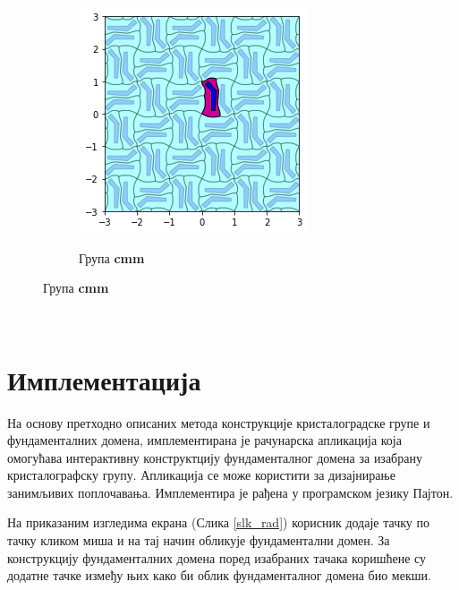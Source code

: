 \documentclass[12pt]{article}
\begin{document}
\begin{samepage}
\begin{figure}[H]
\begin{subfigure}[b]{0.3\textwidth}
  \end{subfigure}
  \begin{subfigure}[b]{0.3\textwidth}
    \includegraphics[width=\textwidth]{output_21_7.png}
    \label{fig:f25}
    \caption{Група \textbf{cmm}}
  \end{subfigure}
\end{figure}
\end{samepage}

\quad \\ \qquad

\newpage
    \section{Имплементација}\label{implementacija}

На основу претходно описаних метода конструкције кристалоградске групе и фундаменталних домена, имплементирана је рачунарска апликација која омогућава интерактивну конструктцију фундаменталног домена за изабрану кристалографску групу.
Апликација се може користити за дизајнирање занимљивих поплочавања.
Имплементира је рађена у програмском језику Пајтон.

На приказаним изгледима екрана (Слика \ref{slk_rad}) корисник додаје тачку по тачку кликом миша и на тај начин обликује фундаментални домен. За конструкцију фундаменталних домена поред изабраних тачака коришћене су додатне тачке између њих како би облик фундаменталног домена био мекши. 
\end{document}
